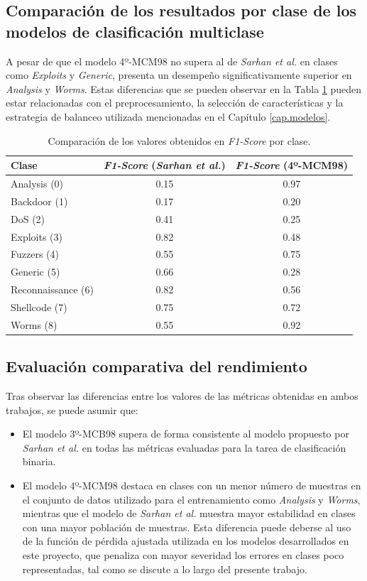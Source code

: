 \subsection{Comparación de los resultados por clase de los modelos de clasificación multiclase}

A pesar de que el modelo 4º-MCM98 no supera al de \textit{Sarhan et al.} en clases como \textit{Exploits} y \textit{Generic}, presenta un desempeño significativamente superior en \textit{Analysis} y \textit{Worms}. Estas diferencias que se pueden observar en la Tabla \ref{tab:compmulclass} pueden estar relacionadas con el preprocesamiento, la selección de características y la estrategia de balanceo utilizada mencionadas en el Capítulo \ref{cap.modelos}.

\begin{table}[H]
\centering
\begin{tabular}{|l|c|c|}
\hline
\textbf{Clase} & \textbf{\textit{F1-Score} (\textit{Sarhan et al.})} & \textbf{\textit{F1-Score} (4º-MCM98)} \\
\hline
Analysis (0) & 0.15 & 0.97 \\
Backdoor (1) & 0.17 & 0.20 \\
DoS (2) & 0.41 & 0.25 \\
Exploits (3) & 0.82 & 0.48 \\
Fuzzers (4) & 0.55 & 0.75 \\
Generic (5) & 0.66 & 0.28 \\
Reconnaissance (6) & 0.82 & 0.56 \\
Shellcode (7) & 0.75 & 0.72 \\
Worms (8) & 0.55 & 0.92 \\
\hline
\end{tabular}
\caption{Comparación de los valores obtenidos en \textit{F1-Score} por clase.}
\label{tab:compmulclass}
\end{table}


\subsection{Evaluación comparativa del rendimiento}
Tras observar las diferencias entre los valores de las métricas obtenidas en ambos trabajos, se puede asumir que:

\begin{itemize}
    \item El modelo 3º-MCB98 supera de forma consistente al modelo propuesto por \textit{Sarhan et al.} en todas las métricas evaluadas para la tarea de clasificación binaria.
  \item El modelo 4º-MCM98 destaca en clases con un menor número de muestras en el conjunto de datos utilizado para el entrenamiento como \textit{Analysis} y \textit{Worms}, mientras que el modelo de \textit{Sarhan et al.} muestra mayor estabilidad en clases con una mayor población de muestras. Esta diferencia puede deberse al uso de la función de pérdida ajustada utilizada en los modelos desarrollados en este proyecto, que penaliza con mayor severidad los errores en clases poco representadas, tal como se discute a lo largo del presente trabajo.
  
\end{itemize}


